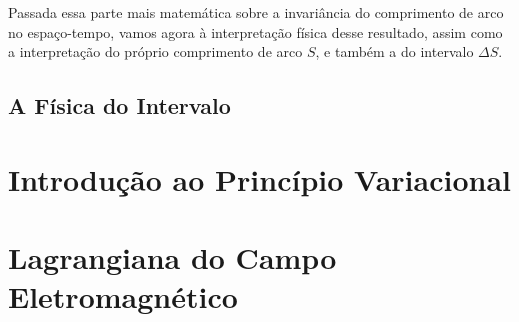 \documentclass[12pt,a4paper]{article}
\begin{document}
Passada essa parte mais matemática sobre a invariância do comprimento de arco no espaço-tempo, vamos agora 
à interpretação física desse resultado, assim como a interpretação do próprio comprimento de arco $S$, e também
a do intervalo $\Delta S$.
\subsection{A Física do Intervalo}
\section{Introdução ao Princípio Variacional}

\section{Lagrangiana do Campo Eletromagnético}

\newpage
\printbibliography
\end{document}
